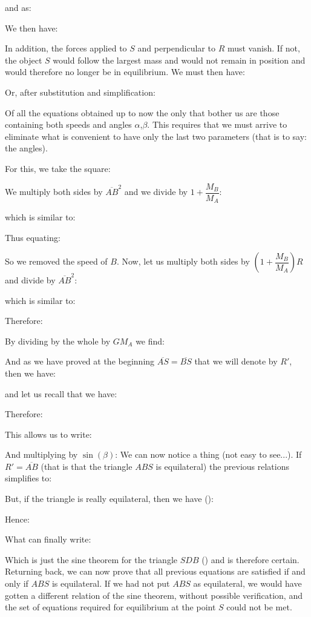 	
	and as:
	
	We then have:
	
	In addition, the forces applied to $S$ and perpendicular to $R$ must vanish. If not, the object $S$ would follow the largest mass and would not remain in position and would therefore no longer be in equilibrium. We must then have:
	
	Or, after substitution and simplification:
	
	Of all the equations obtained up to now the only that bother us are those containing both speeds and angles $\alpha$,$\beta$. This requires that we must arrive to eliminate what is convenient to have only the last two parameters (that is to say: the angles).

	For this, we take the square:
	
	We multiply both sides by $\overline{AB}^2$ and we divide by $1+\dfrac{M_B}{M_A}$:
	
	which is similar to:
	
	Thus equating:
	
	So we removed the speed of $B$. Now, let us multiply both sides by $\left(1+\dfrac{M_B}{M_A}\right)R$ and divide by $\overline{AB}^2$:
	
	which is similar to:
	
	Therefore:
	
	By dividing by the whole by $GM_A$ we find:
	
	And as we have proved at the beginning $\overline{AS}=\overline{BS}$ that we will denote by $R'$, then we have:
	
	and let us recall that we have:
	
	Therefore:
	
	This allows us to write:
	
	And multiplying by $\sin(\beta)$:
	We can now notice a thing (not easy to see...). If $R'=\overline{AB}$ (that is that the triangle $ABS$ is equilateral) the previous relations simplifies to:
	
	But, if the triangle is really equilateral, then we have ():
	
	Hence:
	
	What can finally write:
	
	Which is just the sine theorem for the triangle $SDB$ () and is therefore certain. Returning back, we can now prove that all previous equations are satisfied if and only if $ABS$ is equilateral. If we had not put $ABS$ as equilateral, we would have gotten a different relation of the sine theorem, without possible verification, and the set of equations required for equilibrium at the point $S$ could not be met.

